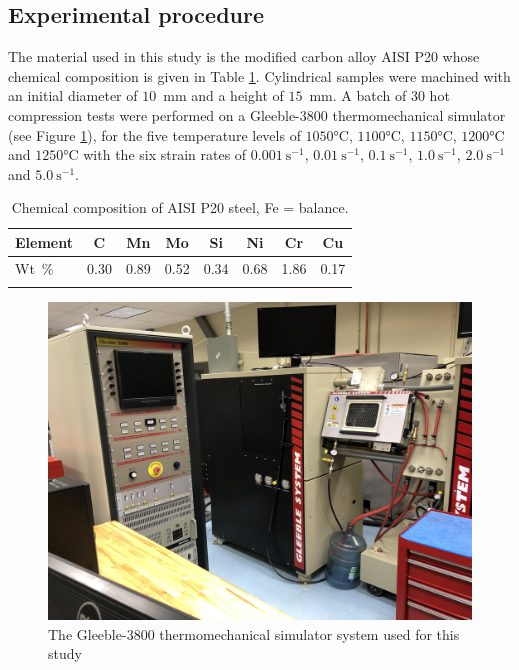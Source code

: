 \documentclass[twoside,english,1p,final,sort&compress]{elsarticle}
\theoremstyle{plain}
\begin{document}
\subsection{Experimental procedure}

The material used in this study is the modified carbon alloy AISI P20 whose chemical composition is given in Table \ref{tab:Composition}. Cylindrical samples were machined with an initial diameter of $10$~mm and a height of $15$~mm. A batch of $30$ hot compression tests were performed on a Gleeble-3800 thermomechanical simulator (see Figure \ref{fig:Gleeble3800}), for the five temperature levels of $1050$°C, $1100$°C, $1150$°C, $1200$°C and $1250$°C with the six strain rates of $0.001~\text{s}^{-1}$, $0.01~\text{s}^{-1}$, $0.1~\text{s}^{-1}$, $1.0~\text{s}^{-1}$, $2.0~\text{s}^{-1}$ and $5.0~\text{s}^{-1}$. 

\begin{table}[h!]
\centering
\caption{Chemical composition of AISI P20 steel, Fe = balance.}
\begin{tabular}{lccccccc}
\hline
Element & C & Mn & Mo & Si & Ni & Cr & Cu\\ \hline
Wt~\% & 0.30 & 0.89 & 0.52 & 0.34 & 0.68 & 1.86 & 0.17\\ \hline
\label{tab:Composition}
\end{tabular}
\end{table}
\begin{figure}[!ht]
\centering
\includegraphics[width=0.7\columnwidth]{Figures/Gleeble-3800}
\caption{The Gleeble-3800 thermomechanical simulator system used for this study}
\label{fig:Gleeble3800}
\end{figure}
\end{document}
